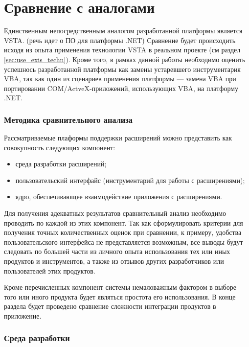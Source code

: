 \section{Сравнение с аналогами}

Единственным непосредственным аналогом разработанной платформы является VSTA. (речь идет о ПО для платформы .NET)  Сравнение будет происходить исходя из опыта применения технологии VSTA в реальном проекте (см раздел \ref{sec:use_exis_techn}). Кроме того, в рамках данной работы необходимо оценить успешнось разработанной платформы как замены устаревшего инструментария VBA, так как один из сценариев применения платформы --- замена VBA при портировании COM/ActveX-приложений, использующих VBA, на платформу .NET.

\subsubsection{Методика сравнительного анализа}

Рассматриваемые плаформы поддержки расширений можно представить как совокупность следующих компонент:

\begin{itemize}
   \item среда разработки расширений;
   \item пользовательский интерфайс (инструментарий для работы с расширениями);
   \item ядро, обеспечивающее взаимодействие приложения с расширениями.
\end{itemize}

Для получения адекватных результатов сравнительный анализ необходимо проводить по каждой из этих компонент. Так как сформулировать критерии для получения точных количественных оценок при сравнении, к примеру, удобства пользовательского интерфейса не представляется возможным, все выводы будут следовать по большей части из личного опыта использования тех или иных продуктов и инструментов, а также из отзывов других разработчиков или пользователей этих продуктов.

Кроме перечисленных компонент системы немаловажным фактором в выборе того или иного продукта будет являться простота его использования. В конце раздела будет проведено сравнение сложности интеграции продуктов в приложение.

\subsubsection{Среда разработки}

